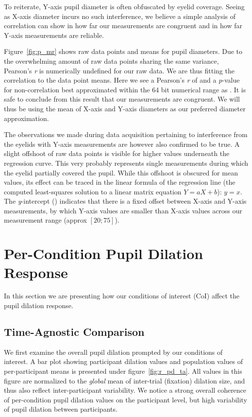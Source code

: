 	To reiterate, Y-axis pupil diameter is often obfuscated by eyelid coverage.
	Seeing as X-axis diameter incurs no such interference, we believe a simple analysis of correlation can show in how far our measurements are congruent and in how far Y-axis measurements are reliable.

	
	Figure~\ref{fig:p_mr} shows raw data points and means for pupil diameters.
	Due to the overwhelming amount of raw data points sharing the same variance, Pearson's \textit{r} is numerically undefined for our raw data.
	We are thus fitting the correlation to the data point means. 
	Here we see a Pearson's \textit{r} of  and a \textit{p}-value for non-correlation best approximated within the 64 bit numerical range as  .
	It is safe to conclude from this result that our measurements are congruent.
	We will thus be using the mean of X-axis and Y-axis diameters as our preferred diameter approximation.
	
	The observations we made during data acquisition pertaining to interference from the eyelids with Y-axis measurements are however also confirmed to be true.
	A slight offshoot of raw data points is visible for higher values underneath the regression curve.
	This very probably represents single measurements during which the eyelid partially covered the pupil.  
	While this offshoot is obscured for mean values, its effect can be traced in the linear formula of the regression line (the computed least-squares solution to a linear matrix equation $Y = aX + b$): 
	$y = $$x$.
	The \textit{y}-intercept () indicates that there is a fixed offset between X-axis and Y-axis measurements, by which Y-axis values are smaller than X-axis values across our measurement range (approx $[20;75]$).
	
    \section{Per-Condition Pupil Dilation Response}\label{sec:r_pd}
	In this section we are presenting how our conditions of interest (CoI) affect the pupil dilation response.
	\subsection{Time-Agnostic Comparison}\label{sec:r_pd_ta}
	    We first examine the overall pupil dilation prompted by our conditions of interest.
	    A bar plot showing participant dilation values and population values of per-participant means is presented under figure~\ref{fig:r_pd_ta}.
	    All values in this figure are normalized to the \textit{global} mean of inter-trial (fixation) dilation size, and thus also reflect inter-participant variability.
	    We notice a strong overall coherence of per-condition pupil dilation values on the participant level, but high variability of pupil dilation between participants.
	    
